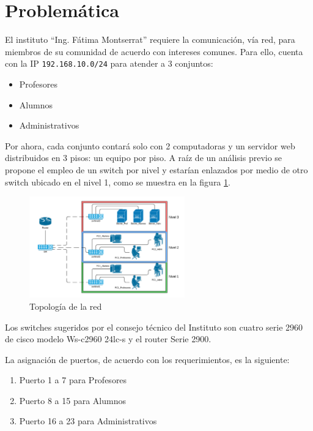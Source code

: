 \section{Problemática}
El instituto ``Ing. Fátima Montserrat'' requiere la comunicación, vía red, para miembros de su comunidad de acuerdo con intereses comunes.
Para ello, cuenta con la IP \texttt{192.168.10.0/24} para atender a 3 conjuntos:
    \begin{itemize}
        \item Profesores
        \item Alumnos
        \item Administrativos
    \end{itemize}

Por ahora, cada conjunto contará solo con 2 computadoras y un servidor web distribuidos en 3 pisos: un equipo por piso. A raíz de un análisis previo se propone el empleo de un switch por nivel y estarían enlazados por medio de otro switch ubicado en el nivel 1, como se muestra en la figura \ref{fig:topologia}.

\begin{figure}[H]
    \centering
    \includegraphics[width=0.6\textwidth]{img/topologia.png}
    \caption{Topología de la red}
    \label{fig:topologia}
\end{figure}

Los switches sugeridos por el consejo técnico del Instituto son cuatro serie 2960 de cisco modelo Ws-c2960 24lc-s y el router Serie 2900.

La asignación de puertos, de acuerdo con los requerimientos, es la siguiente:

\begin{enumerate}
    \item Puerto 1 a 7 para Profesores
    \item Puerto 8 a 15 para Alumnos
    \item Puerto 16 a 23 para Administrativos
\end{enumerate}

